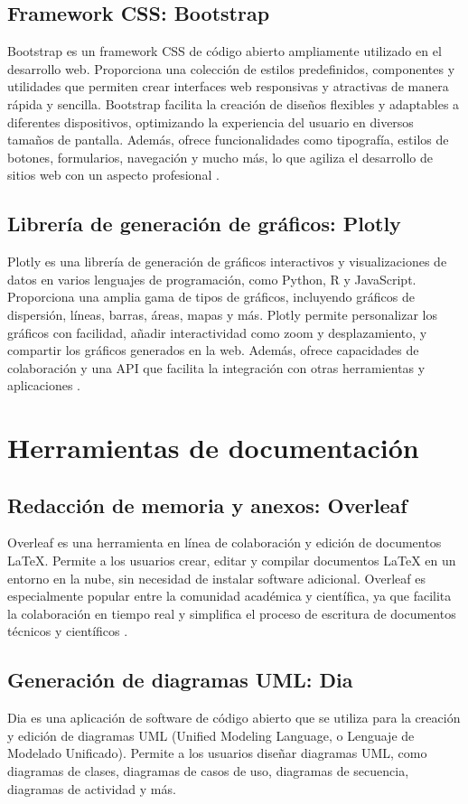 \subsection{Framework CSS: Bootstrap}
Bootstrap es un framework CSS de código abierto ampliamente utilizado en el desarrollo web. Proporciona una colección de estilos predefinidos, componentes y utilidades que permiten crear interfaces web responsivas y atractivas de manera rápida y sencilla. Bootstrap facilita la creación de diseños flexibles y adaptables a diferentes dispositivos, optimizando la experiencia del usuario en diversos tamaños de pantalla. Además, ofrece funcionalidades como tipografía, estilos de botones, formularios, navegación y mucho más, lo que agiliza el desarrollo de sitios web con un aspecto profesional \cite{bootstrap}.
\subsection{Librería de generación de gráficos: Plotly}
Plotly es una librería de generación de gráficos interactivos y visualizaciones de datos en varios lenguajes de programación, como Python, R y JavaScript. Proporciona una amplia gama de tipos de gráficos, incluyendo gráficos de dispersión, líneas, barras, áreas, mapas y más. Plotly permite personalizar los gráficos con facilidad, añadir interactividad como zoom y desplazamiento, y compartir los gráficos generados en la web. Además, ofrece capacidades de colaboración y una API que facilita la integración con otras herramientas y aplicaciones \cite{10.1111/rssa.12692}.

\section{Herramientas de documentación}
\subsection{Redacción de memoria y anexos: Overleaf}
Overleaf es una herramienta en línea de colaboración y edición de documentos LaTeX. Permite a los usuarios crear, editar y compilar documentos LaTeX en un entorno en la nube, sin necesidad de instalar software adicional. Overleaf es especialmente popular entre la comunidad académica y científica, ya que facilita la colaboración en tiempo real y simplifica el proceso de escritura de documentos técnicos y científicos \cite{overleaf}.
\subsection{Generación de diagramas UML: Dia}
Dia es una aplicación de software de código abierto que se utiliza para la creación y edición de diagramas UML (Unified Modeling Language, o Lenguaje de Modelado Unificado). Permite a los usuarios diseñar diagramas UML, como diagramas de clases, diagramas de casos de uso, diagramas de secuencia, diagramas de actividad y más.

